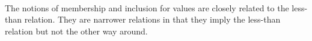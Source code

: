 \begin{fence}
\begin{code}%
\>[0]\AgdaSpace{}%
\AgdaSpace{}%
\<%
\\
%
\\[\AgdaEmptyExtraSkip]%
\>[0]\AgdaSpace{}%
\AgdaSymbol{:}\AgdaSpace{}%
\AgdaSpace{}%
\AgdaSpace{}%
\AgdaSpace{}%
\AgdaSpace{}%
\<%
\\
\>[0]\AgdaSpace{}%
\AgdaSpace{}%
\AgdaSpace{}%
\AgdaSymbol{=}\AgdaSpace{}%
\AgdaSymbol{\}}\AgdaSpace{}%
\AgdaSpace{}%
\AgdaSpace{}%
\AgdaSpace{}%
\AgdaSpace{}%
\AgdaSpace{}%
\AgdaSpace{}%
\AgdaSpace{}%
\<%
\end{code}
\end{fence}

The notions of membership and inclusion for values are closely related
to the less-than relation. They are narrower relations in that they
imply the less-than relation but not the other way around.

